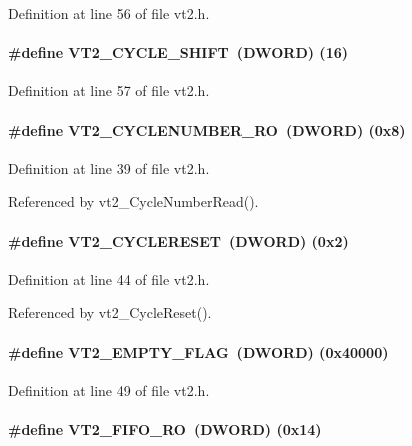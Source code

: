 Definition at line 56 of file vt2.h.
\paragraph[{VT2\_\-CYCLE\_\-SHIFT}]{\setlength{\rightskip}{0pt plus 5cm}\#define VT2\_\-CYCLE\_\-SHIFT~({\bf DWORD}) (16)}\hfill\label{vt2_8h_ad1928c58a067f96a71dca2ce49b4b978}


Definition at line 57 of file vt2.h.
\paragraph[{VT2\_\-CYCLENUMBER\_\-RO}]{\setlength{\rightskip}{0pt plus 5cm}\#define VT2\_\-CYCLENUMBER\_\-RO~({\bf DWORD}) (0x8)}\hfill\label{vt2_8h_aa8a88d2f91beef9d9e5de8640de4ade4}


Definition at line 39 of file vt2.h.

Referenced by vt2\_\-CycleNumberRead().
\paragraph[{VT2\_\-CYCLERESET}]{\setlength{\rightskip}{0pt plus 5cm}\#define VT2\_\-CYCLERESET~({\bf DWORD}) (0x2)}\hfill\label{vt2_8h_ab45b63f48bd8d95bd76e99b77dc96b34}


Definition at line 44 of file vt2.h.

Referenced by vt2\_\-CycleReset().
\paragraph[{VT2\_\-EMPTY\_\-FLAG}]{\setlength{\rightskip}{0pt plus 5cm}\#define VT2\_\-EMPTY\_\-FLAG~({\bf DWORD}) (0x40000)}\hfill\label{vt2_8h_a9067b23ab486b40580f7f733389f72a5}


Definition at line 49 of file vt2.h.
\paragraph[{VT2\_\-FIFO\_\-RO}]{\setlength{\rightskip}{0pt plus 5cm}\#define VT2\_\-FIFO\_\-RO~({\bf DWORD}) (0x14)}\hfill\label{vt2_8h_a710857f1c296ee8e8b34eaf9ad455216}


